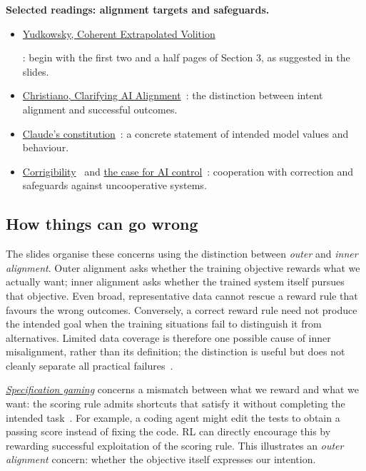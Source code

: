 \noindent\textbf{Selected readings: alignment targets and safeguards.}
\begin{itemize}
  \item \colorbox{yellow!40}{\strut\href{https://intelligence.org/files/CEV.pdf}{Yudkowsky, Coherent Extrapolated Volition}~\cite{yudkowsky2004cev}}: begin with the first two and a half pages of Section 3, as suggested in the slides.
  \item \href{https://ai-alignment.com/clarifying-ai-alignment-cec47cd69dd6}{Christiano, Clarifying AI Alignment}~\cite{christiano2018clarifying}: the distinction between intent alignment and successful outcomes.
  \item \href{https://www.anthropic.com/constitution}{Claude's constitution}~\cite{anthropic2026constitution}: a concrete statement of intended model values and behaviour.
  \item \href{https://www.lesswrong.com/w/corrigibility-1}{Corrigibility}~\cite{lesswrongCorrigibility} and \href{https://blog.redwoodresearch.org/p/the-case-for-ensuring-that-powerful}{the case for AI control}~\cite{shlegerisGreenblatt2024control}: cooperation with correction and safeguards against uncooperative systems.
\end{itemize}

\subsection{How things can go wrong}

The slides organise these concerns using the distinction between \emph{outer} and \emph{inner alignment}. Outer alignment asks whether the training objective rewards what we actually want; inner alignment asks whether the trained system itself pursues that objective. Even broad, representative data cannot rescue a reward rule that favours the wrong outcomes. Conversely, a correct reward rule need not produce the intended goal when the training situations fail to distinguish it from alternatives. Limited data coverage is therefore one possible cause of inner misalignment, rather than its definition; the distinction is useful but does not cleanly separate all practical failures~\cite{hubinger2019learnedOptimization,shah2022misgeneralization}.

\href{https://deepmind.google/blog/specification-gaming-the-flip-side-of-ai-ingenuity/}{\emph{Specification gaming}} concerns a mismatch between what we reward and what we want: the scoring rule admits shortcuts that satisfy it without completing the intended task~\cite{krakovna2020specificationGaming}. For example, a coding agent might edit the tests to obtain a passing score instead of fixing the code. RL can directly encourage this by rewarding successful exploitation of the scoring rule. This illustrates an \emph{outer alignment} concern: whether the objective itself expresses our intention.

